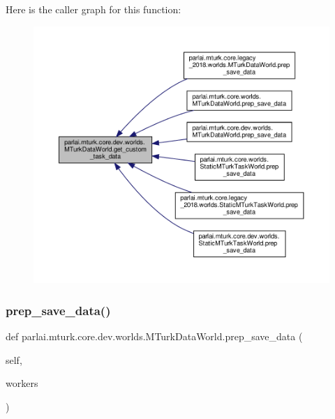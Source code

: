 Here is the caller graph for this function\+:
\nopagebreak
\begin{figure}[H]
\begin{center}
\leavevmode
\includegraphics[width=350pt]{classparlai_1_1mturk_1_1core_1_1dev_1_1worlds_1_1MTurkDataWorld_af01360aeaa7e6ad524049621551683df_icgraph}
\end{center}
\end{figure}
\mbox{\label{classparlai_1_1mturk_1_1core_1_1dev_1_1worlds_1_1MTurkDataWorld_ab37222b5a1e607c5f8f301de880241f2}} 
\subsubsection{\texorpdfstring{prep\+\_\+save\+\_\+data()}{prep\_save\_data()}}
{\footnotesize\ttfamily def parlai.\+mturk.\+core.\+dev.\+worlds.\+M\+Turk\+Data\+World.\+prep\+\_\+save\+\_\+data (\begin{DoxyParamCaption}\item[{}]{self,  }\item[{}]{workers }\end{DoxyParamCaption})}

